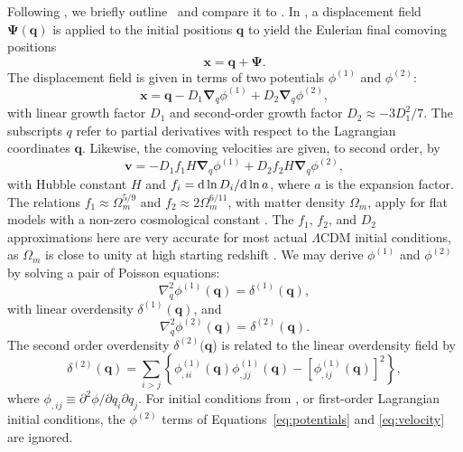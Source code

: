 Following \citet{2010MNRAS.403.1859J}, we briefly outline \lpt\ and compare it to \za.  In \lpt, a displacement field $\boldsymbol{\Psi}(\boldsymbol{q})$ is applied to the initial positions $\boldsymbol{q}$ to yield the Eulerian final comoving positions
\begin{equation} \label{eq:displacement}
	\boldsymbol{x} = \boldsymbol{q} + \boldsymbol{\Psi}.
\end{equation}
The displacement field is given in terms of two potentials $\phi^{(1)}$ and $\phi^{(2)}$:
\begin{equation} \label{eq:potentials}
	\boldsymbol{x} = \boldsymbol{q} - D_{1} \boldsymbol{\nabla}_{q} \phi^{(1)} + D_{2} \boldsymbol{\nabla}_{q} \phi^{(2)},
\end{equation}
with linear growth factor $D_{1}$ and second-order growth factor $D_{2} \approx -3 D_{1}^{2} / 7$.  The subscripts $q$ refer to partial derivatives with respect to the Lagrangian coordinates $\boldsymbol{q}$.  Likewise, the comoving velocities are given, to second order, by
\begin{equation} \label{eq:velocity}
	\boldsymbol{v} =  - D_{1} f_{1} H \boldsymbol{\nabla}_{q} \phi^{(1)} + D_{2} f_{2} H \boldsymbol{\nabla}_{q} \phi^{(2)},
\end{equation}
with Hubble constant $H$ and $f_{i} = {\rm {d}}\, \mathrm{ln}\, D_{i} / {\rm {d}}\, \mathrm{ln}\, a$, where $a$ is the expansion factor.  The relations $f_{1} \approx \Omega_{m}^{5/9}$ and $f_{2} \approx 2 \Omega_{m}^{6/11}$, with matter density $\Omega_{m}$, apply for flat models with a non-zero cosmological constant \citep{1995A&A...296..575B}.  The $f_{1}$, $f_{2}$, and $D_{2}$ approximations here are very accurate for most actual $\Lambda$CDM initial conditions, as $\Omega_{m}$ is close to unity at high starting redshift \citep{2010MNRAS.403.1859J}.  We may derive $\phi^{(1)}$ and $\phi^{(2)}$ by solving a pair of Poisson equations:
\begin{equation} \label{eq:poisson1}
	\nabla_{q}^{2} \phi^{(1)}(\boldsymbol{q}) = \delta^{(1)}(\boldsymbol{q}),
\end{equation}
with linear overdensity $\delta^{(1)}(\boldsymbol{q})$, and
\begin{equation} \label{eq:poisson2}
	\nabla_{q}^{2} \phi^{(2)}(\boldsymbol{q}) = \delta^{(2)}(\boldsymbol{q}).
\end{equation}
The second order overdensity $\delta^{(2)}(\boldsymbol{q}$) is related to the linear overdensity field by
\begin{equation} \label{eq:second-order_overdensity}
	\delta^{(2)}(\boldsymbol{q}) = \sum_{i > j} \left\{ \phi_{,ii}^{(1)}(\boldsymbol{q}) \phi_{,jj}^{(1)}(\boldsymbol{q}) - \left[ \phi_{,ij}^{(1)}(\boldsymbol{q}) \right]^{2} \right\},
\end{equation}
where $\phi_{,ij} \equiv \partial^{2} \phi / \partial q_{i} \partial q_{j}$.  For initial conditions from \za, or first-order Lagrangian initial conditions, the $\phi^{(2)}$ terms of Equations~\ref{eq:potentials} and \ref{eq:velocity} are ignored.




